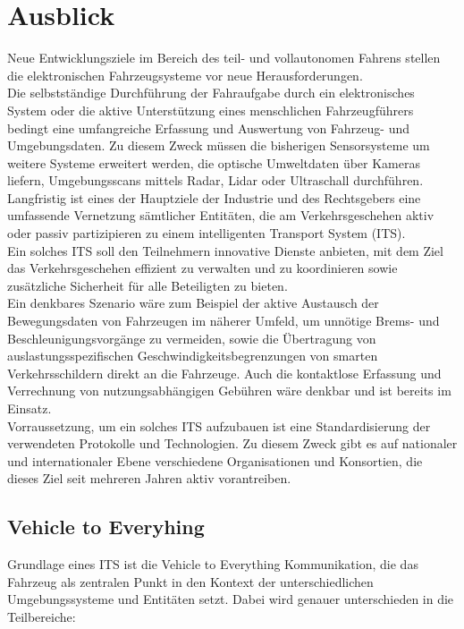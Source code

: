 \section{Ausblick}

    Neue Entwicklungsziele im Bereich des teil- und vollautonomen Fahrens stellen die elektronischen Fahrzeugsysteme vor neue Herausforderungen.\\
    Die selbstständige Durchführung der Fahraufgabe durch ein elektronisches System oder die aktive Unterstützung eines menschlichen Fahrzeugführers
    bedingt eine umfangreiche Erfassung und Auswertung von Fahrzeug- und Umgebungsdaten.
    Zu diesem Zweck müssen die bisherigen Sensorsysteme um weitere Systeme erweitert werden, die optische Umweltdaten über Kameras liefern, Umgebungsscans
    mittels Radar, Lidar oder Ultraschall durchführen. ~\cite{.BP06}\\

    Langfristig ist eines der Hauptziele der Industrie und des Rechtsgebers eine umfassende Vernetzung
    sämtlicher Entitäten, die am Verkehrsgeschehen aktiv oder passiv partizipieren zu einem intelligenten
    Transport System (ITS).\\
    Ein solches ITS soll den Teilnehmern innovative Dienste anbieten, mit dem Ziel das Verkehrsgeschehen
    effizient zu verwalten und zu koordinieren sowie zusätzliche Sicherheit für alle Beteiligten zu bieten. ~\cite{.BP04}\\

    Ein denkbares Szenario wäre zum Beispiel der aktive Austausch der Bewegungsdaten von Fahrzeugen im näherer Umfeld, um unnötige Brems-
    und Beschleunigungsvorgänge zu vermeiden, sowie die Übertragung von auslastungsspezifischen Geschwindigkeitsbegrenzungen von smarten Verkehrsschildern
    direkt an die Fahrzeuge. Auch die kontaktlose Erfassung und Verrechnung von nutzungsabhängigen Gebühren wäre denkbar und ist bereits im Einsatz.\\

    Vorraussetzung, um ein solches ITS aufzubauen ist eine Standardisierung der verwendeten Protokolle und Technologien.
    Zu diesem Zweck gibt es auf nationaler und internationaler Ebene verschiedene Organisationen und Konsortien,
    die dieses Ziel seit mehreren Jahren aktiv vorantreiben.\\

    \subsection{Vehicle to Everyhing}
    Grundlage eines ITS ist die Vehicle to Everything Kommunikation, die das Fahrzeug als zentralen Punkt in den
    Kontext der unterschiedlichen Umgebungssysteme und Entitäten setzt. Dabei wird genauer unterschieden in die Teilbereiche:
    
